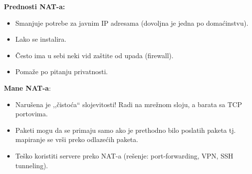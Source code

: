 \documentclass[a4paper]{article}
\begin{document}
        \textbf{Prednosti NAT-a:}
        \begin{itemize}
            \item Smanjuje potrebe za javnim IP adresama (dovoljna je jedna po domaćinstvu).
            \item Lako se instalira.
            \item Često ima u sebi neki vid zaštite od upada (firewall).
            \item Pomaže po pitanju privatnosti.
        \end{itemize}
        \textbf{Mane NAT-a}:
        \begin{itemize}
            \item Narušena je ,,čistoća`` slojevitosti! Radi na mrežnom sloju, a barata sa TCP portovima.
            \item Paketi mogu da se primaju samo ako je prethodno bilo poslatih paketa tj. mapiranje se
                  vrši preko odlazećih paketa.
            \item Teško koristiti servere preko NAT-a (rešenje: port-forwarding, VPN, SSH tunneling).
        \end{itemize}
\end{document}

